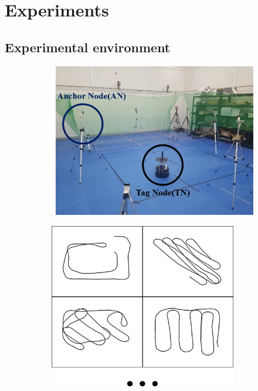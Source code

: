 \documentclass{ieeeaccess}
\begin{document}
\section{Experiments}
\subsection{Experimental environment}

\begin{figure}[h]
	\centering
	\begin{subfigure}[b]{.25\textwidth}
		\centering
		\includegraphics[width=.9\textwidth]{anchor_tag_nodes}
		\label{fig:dataset} 	
		\caption{}
	\end{subfigure}%
	\begin{subfigure}[b]{.25\textwidth}
		\centering
		\includegraphics[width=0.9\textwidth]{paths}

\end{subfigure}
\end{figure}
\end{document}
